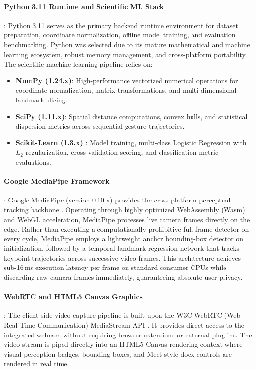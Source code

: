 \paragraph{Python 3.11 Runtime and Scientific ML Stack}:
Python 3.11 serves as the primary backend runtime environment for dataset preparation, coordinate normalization, offline model training, and evaluation benchmarking. Python was selected due to its mature mathematical and machine learning ecosystem, robust memory management, and cross-platform portability. The scientific machine learning pipeline relies on:
\begin{itemize}
    \item \textbf{NumPy (1.24.x)}: High-performance vectorized numerical operations for coordinate normalization, matrix transformations, and multi-dimensional landmark slicing.
    \item \textbf{SciPy (1.11.x)}: Spatial distance computations, convex hulls, and statistical dispersion metrics across sequential gesture trajectories.
    \item \textbf{Scikit-Learn (1.3.x)} \cite{22}: Model training, multi-class Logistic Regression with $L_2$ regularization, cross-validation scoring, and classification metric evaluations.
\end{itemize}

\paragraph{Google MediaPipe Framework}:
Google MediaPipe (version 0.10.x) provides the cross-platform perceptual tracking backbone \cite{2,3,4}. Operating through highly optimized WebAssembly (Wasm) and WebGL acceleration, MediaPipe processes live camera frames directly on the edge. Rather than executing a computationally prohibitive full-frame detector on every cycle, MediaPipe employs a lightweight anchor bounding-box detector on initialization, followed by a temporal landmark regression network that tracks keypoint trajectories across successive video frames. This architecture achieves sub-16\,ms execution latency per frame on standard consumer CPUs while discarding raw camera frames immediately, guaranteeing absolute user privacy.

\paragraph{WebRTC and HTML5 Canvas Graphics}:
The client-side video capture pipeline is built upon the W3C WebRTC (Web Real-Time Communication) MediaStream API \cite{25}. It provides direct access to the integrated webcam without requiring browser extensions or external plug-ins. The video stream is piped directly into an HTML5 Canvas rendering context where visual perception badges, bounding boxes, and Meet-style dock controls are rendered in real time.

